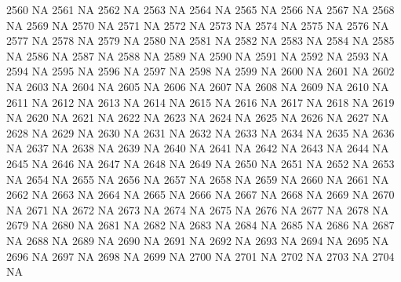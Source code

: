 \documentclass{article}
\begin{document}
\begin{Schunk}
\begin{Soutput}
2560           NA
2561           NA
2562           NA
2563           NA
2564           NA
2565           NA
2566           NA
2567           NA
2568           NA
2569           NA
2570           NA
2571           NA
2572           NA
2573           NA
2574           NA
2575           NA
2576           NA
2577           NA
2578           NA
2579           NA
2580           NA
2581           NA
2582           NA
2583           NA
2584           NA
2585           NA
2586           NA
2587           NA
2588           NA
2589           NA
2590           NA
2591           NA
2592           NA
2593           NA
2594           NA
2595           NA
2596           NA
2597           NA
2598           NA
2599           NA
2600           NA
2601           NA
2602           NA
2603           NA
2604           NA
2605           NA
2606           NA
2607           NA
2608           NA
2609           NA
2610           NA
2611           NA
2612           NA
2613           NA
2614           NA
2615           NA
2616           NA
2617           NA
2618           NA
2619           NA
2620           NA
2621           NA
2622           NA
2623           NA
2624           NA
2625           NA
2626           NA
2627           NA
2628           NA
2629           NA
2630           NA
2631           NA
2632           NA
2633           NA
2634           NA
2635           NA
2636           NA
2637           NA
2638           NA
2639           NA
2640           NA
2641           NA
2642           NA
2643           NA
2644           NA
2645           NA
2646           NA
2647           NA
2648           NA
2649           NA
2650           NA
2651           NA
2652           NA
2653           NA
2654           NA
2655           NA
2656           NA
2657           NA
2658           NA
2659           NA
2660           NA
2661           NA
2662           NA
2663           NA
2664           NA
2665           NA
2666           NA
2667           NA
2668           NA
2669           NA
2670           NA
2671           NA
2672           NA
2673           NA
2674           NA
2675           NA
2676           NA
2677           NA
2678           NA
2679           NA
2680           NA
2681           NA
2682           NA
2683           NA
2684           NA
2685           NA
2686           NA
2687           NA
2688           NA
2689           NA
2690           NA
2691           NA
2692           NA
2693           NA
2694           NA
2695           NA
2696           NA
2697           NA
2698           NA
2699           NA
2700           NA
2701           NA
2702           NA
2703           NA
2704           NA

\end{Soutput}
\end{Schunk}
\end{document}
